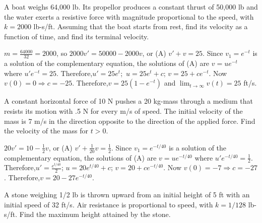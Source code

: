\documentclass{ximera}
\begin{document}
\begin{problem}\label{exer:4.3.3}
A boat weighs 64,000 lb. Its propellor produces a constant thrust of
50,000 lb and the water exerts a resistive force with magnitude
proportional to the speed, with $k=2000$ lb-s/ft. Assuming that the
boat starts from rest, find its velocity as a function of time, and
find its terminal velocity.

\begin{solution}
$m=\frac{64000}{32}=2000$, so
 $2000v'=50000-2000v$, or (A)
$v'+v=25$.
Since $v_1=e^{-t}$ is a solution of the complementary equation,
the solutions of (A) are $v=ue^{-t}$ where $u'e^{-t}=25$.
Therefore,$u'=25e^t$;\ $u=25e^t+c$;\;
$v=25+ce^{-t}$. Now $v(0)=0\Rightarrow
c=-25$. Therefore,$v=25(1-e^{-t})$
and $\lim_{t\to\infty}v(t)=25$ ft/s.
\end{solution}
\end{problem}

\begin{problem}\label{exer:4.3.4}
A constant horizontal force of 10 N pushes a 20 kg-mass through a
medium that resists its motion with .5 N for every m/s of speed. The
initial velocity of the mass is 7 m/s in the direction opposite to
the direction of the applied force. Find the velocity of the mass for
$t > 0$.

\begin{solution}
$20v'=10-\frac{1}{2}v$, or (A)
$v'+\frac{1}{20}v=\frac{1}{2}$.
Since $v_1=e^{-t/40}$ is a solution of the complementary equation,
the solutions of (A) are $v=ue^{-t/40}$ where
$u'e^{-t/40}=\frac{1}{2}$. Therefore,$u'=\frac{e^{t/40}}{2}$;\;
$u=20e^{t/40}+c$;\;
$v=20+ce^{-t/40}$. Now $v(0)=-7\Rightarrow
c=-27$. Therefore,$v=20-27e^{-t/40}$.
\end{solution}
\end{problem}

\begin{problem}\label{exer:4.3.5}
A stone weighing 1/2 lb is thrown upward from an initial height of 5
ft with an initial speed of 32 ft/s. Air resistance is
proportional to speed, with $k=1/128$ lb-s/ft. Find the
maximum height attained by the stone.
\end{problem}
\end{document}
